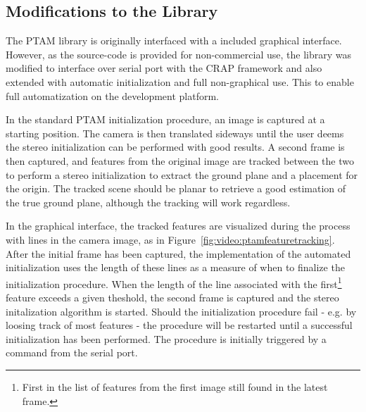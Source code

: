        \subsection{Modifications to the Library}
            The PTAM library is originally interfaced with a included graphical interface.
            However, as the source-code is provided for non-commercial use, the
            library was modified to interface over serial port with the CRAP framework
            and also extended with automatic initialization and full non-graphical use.
            This to enable full automatization on the development platform.

            In the standard PTAM initialization procedure, an image is captured
            at a starting position. The camera is then translated sideways until the user
            deems the stereo initialization can be performed with good results.
            A second frame is then captured, and features from the original image
            are tracked between the two to perform a stereo initialization to
            extract the ground plane and a placement for the origin.
            The tracked scene should be planar to retrieve a good estimation
            of the true ground plane, although the tracking will work regardless.


            In the graphical interface, the tracked features are visualized
            during the process with lines in the camera image, as in Figure~\ref{fig:video:ptamfeaturetracking}.
            After the initial frame has been captured, the implementation
            of the automated initialization uses the length of these lines as
            a measure of when to finalize the initialization procedure.
            When the length of the line associated with the first\footnote{First in the list of features from the first image still found in the latest frame.}
            feature exceeds a given theshold, the second frame is
            captured and the stereo initalization algorithm is started.
            Should the initialization procedure fail - e.g. by loosing track of most features - the
            procedure will be restarted until a successful initialization has been performed.
            The procedure is initially triggered by a command from the serial port.

